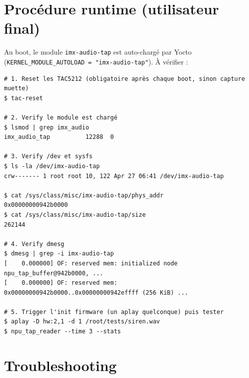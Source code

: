 \documentclass[11pt,a4paper]{article}
\begin{document}
\section{Procédure runtime (utilisateur final)}

Au boot, le module \texttt{imx-audio-tap} est auto-chargé par Yocto
(\texttt{KERNEL\_MODULE\_AUTOLOAD = "imx-audio-tap"}). À vérifier :

\begin{lstlisting}
# 1. Reset les TAC5212 (obligatoire après chaque boot, sinon capture muette)
$ tac-reset

# 2. Verify le module est chargé
$ lsmod | grep imx_audio
imx_audio_tap          12288  0

# 3. Verify /dev et sysfs
$ ls -la /dev/imx-audio-tap
crw------- 1 root root 10, 122 Apr 27 06:41 /dev/imx-audio-tap

$ cat /sys/class/misc/imx-audio-tap/phys_addr
0x00000000942b0000
$ cat /sys/class/misc/imx-audio-tap/size
262144

# 4. Verify dmesg
$ dmesg | grep -i imx-audio-tap
[    0.000000] OF: reserved mem: initialized node npu_tap_buffer@942b0000, ...
[    0.000000] OF: reserved mem: 0x00000000942b0000..0x00000000942effff (256 KiB) ...

# 5. Trigger l'init firmware (un aplay quelconque) puis tester
$ aplay -D hw:2,1 -d 1 /root/tests/siren.wav
$ npu_tap_reader --time 3 --stats
\end{lstlisting}

\section{Troubleshooting}
\end{document}
